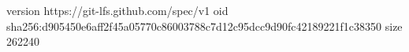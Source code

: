 version https://git-lfs.github.com/spec/v1
oid sha256:d905450e6aff2f45a05770c86003788c7d12c95dcc9d90fc42189221f1c38350
size 262240
